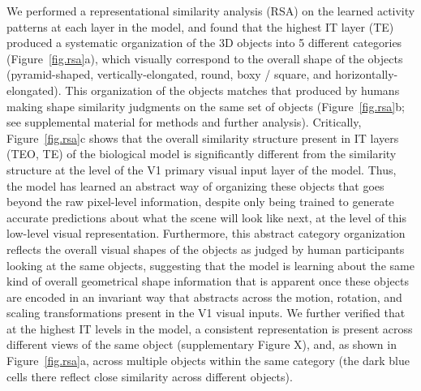 \documentclass[11pt,twoside]{article}
\newif\myifpdf
\begin{document}
We performed a representational similarity analysis (RSA) on the learned activity patterns at each layer in the model, and found that the highest IT layer (TE) produced a systematic organization of the 3D objects into 5 different categories (Figure~\ref{fig.rsa}a), which visually correspond to the overall shape of the objects (pyramid-shaped, vertically-elongated, round, boxy / square, and horizontally-elongated). This organization of the objects matches that produced by humans making shape similarity judgments on the same set of objects (Figure~\ref{fig.rsa}b; see supplemental material for methods and further analysis).  Critically, Figure~\ref{fig.rsa}c shows that the overall similarity structure present in IT layers (TEO, TE) of the biological model is significantly different from the similarity structure at the level of the V1 primary visual input layer of the model.  Thus, the model has learned an abstract way of organizing these objects that goes beyond the raw pixel-level information, despite only being trained to generate accurate predictions about what the scene will look like next, at the level of this low-level visual representation.  Furthermore, this abstract category organization reflects the overall visual shapes of the objects as judged by human participants looking at the same objects, suggesting that the model is learning about the same kind of overall geometrical shape information that is apparent once these objects are encoded in an invariant way that abstracts across the motion, rotation, and scaling transformations present in the V1 visual inputs.  We further verified that at the highest IT levels in the model, a consistent representation is present across different views of the same object (supplementary Figure X), and, as shown in Figure~\ref{fig.rsa}a, across multiple objects within the same category (the dark blue cells there reflect close similarity across different objects).
\end{document}
